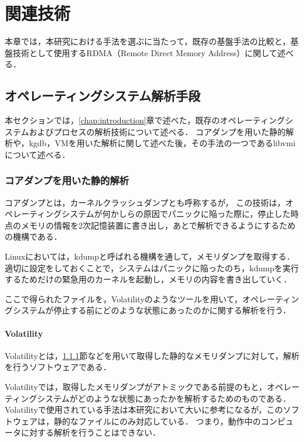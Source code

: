 \chapter{関連技術}
\label{chap:related_works}

本章では，本研究における手法を選ぶに当たって，既存の基盤手法の比較と，基盤技術として使用するRDMA（Remote Direct Memory Address）に関して述べる．

\section{オペレーティングシステム解析手段}

本セクションでは，\ref{chap:introduction}章で述べた，既存のオペレーティングシステムおよびプロセスの解析技術について述べる．
コアダンプを用いた静的解析や，kgdb，VMを用いた解析に関して述べた後，その手法の一つであるlibvmiについて述べる．

\subsection{コアダンプを用いた静的解析}
\label{subsubsection:core_dump}

コアダンプとは，カーネルクラッシュダンプとも呼称する\cite{dump}が，
この技術は，オペレーティングシステムが何かしらの原因でパニックに陥った際に，停止した時点のメモリの情報を2次記憶装置に書き出し，あとで解析できるようにするための機構である．

Linuxにおいては，kdumpと呼ばれる機構を通して，メモリダンプを取得する．
適切に設定をしておくことで，システムはパニックに陥ったのち，kdumpを実行するためだけの緊急用のカーネルを起動し，メモリの内容を書き出していく．

ここで得られたファイルを，Volatility\cite{Volatility}のようなツールを用いて，オペレーティングシステムが停止する前にどのような状態にあったのかに関する解析を行う．

\subsubsection{Volatility}
\label{subsubsection:Volatility}

Volatility\cite{Volatility}とは，\ref{subsubsection:core_dump}節などを用いて取得した静的なメモリダンプに対して，解析を行うソフトウェアである．

Volatilityでは，取得したメモリダンプがアトミックである前提のもと，オペレーティングシステムがどのような状態にあったかを解析するためのものである．
Volatilityで使用されている手法は本研究において大いに参考になるが，このソフトウェアは，静的なファイルにのみ対応している．
つまり，動作中のコンピュータに対する解析を行うことはできない．

